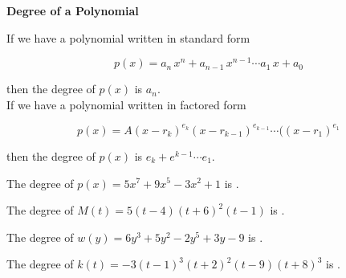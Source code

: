 \documentclass{ximera}
\author{Lee Wayand}
\begin{document}
\begin{exercise}






\begin{idea} \textbf{\textcolor{blue!55!black}{Degree of a Polynomial}}


If we have a polynomial written in standard form

\[
p(x) = a_n \, x^n + a_{n-1} \, x^{n-1} \cdots a_1 \, x + a_0
\]

then the degree of $p(x)$ is $a_n$. \\





If we have a polynomial written in factored form

\[
p(x) = A (x-r_k)^{e_k} (x-r_{k-1})^{e_{k-1}}  \cdots ((x-r_1)^{e_1}
\]

then the degree of $p(x)$ is $e_k + e^{k-1} \cdots e_1$. \\





\end{idea}



\begin{question}


The degree of $p(x) = 5x^7 + 9x^5 - 3x^2 + 1$ is .

\end{question}




\begin{question}


The degree of $M(t) = 5(t - 4) (t + 6)^2 (t - 1)$ is .

\end{question}









\begin{question}


The degree of $w(y) = 6y^3 + 5y^2 - 2y^5 + 3y - 9$ is .

\end{question}




\begin{question}


The degree of $k(t) = -3(t - 1)^3 (t + 2)^2 (t - 9) (t + 8)^3$ is .


\end{question}
\end{exercise}
\end{document}
